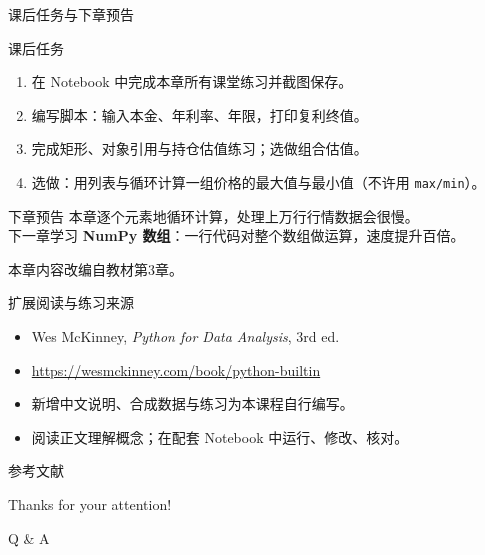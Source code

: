 \documentclass[9pt]{ctexbeamer}
\begin{document}
\begin{frame}{课后任务与下章预告}
	\begin{block}{课后任务}
		\begin{enumerate}
			\item 在 Notebook 中完成本章所有课堂练习并截图保存。
			\item 编写脚本：输入本金、年利率、年限，打印复利终值。
			\item 完成矩形、对象引用与持仓估值练习；选做组合估值。
			\item 选做：用列表与循环计算一组价格的最大值与最小值（不许用 \texttt{max/min}）。
		\end{enumerate}
	\end{block}
	\begin{exampleblock}{下章预告}
		本章逐个元素地循环计算，处理上万行行情数据会很慢。\\
		下一章学习 \textbf{NumPy 数组}：一行代码对整个数组做运算，速度提升百倍。
	\end{exampleblock}
	\begin{center}
		\vspace{0.5em}
		本章内容改编自教材第3章\citep{hilpisch2018python}。
	\end{center}
\end{frame}


\begin{frame}{扩展阅读与练习来源}
\begin{itemize}
\item Wes McKinney, \textit{Python for Data Analysis}, 3rd ed.
\item \url{https://wesmckinney.com/book/python-builtin}
\item 新增中文说明、合成数据与练习为本课程自行编写。
\item 阅读正文理解概念；在配套 Notebook 中运行、修改、核对。
\end{itemize}
\end{frame}

\appendix

\begin{frame}[allowframebreaks]{参考文献}
	
	
\end{frame}

\begin{frame}
	\begin{center}
		{\Huge\calligra Thanks for your attention!}
		\vspace{1cm}

		{\Huge Q \& A}
	\end{center}
\end{frame}
\end{document}
